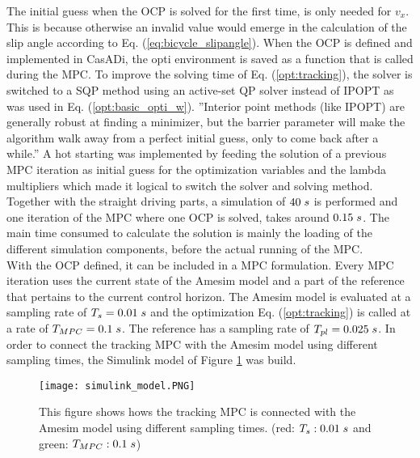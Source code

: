 The initial guess when the OCP is solved for the first time, is only needed for $v_x$. This is because otherwise an invalid value would emerge in the calculation of the slip angle according to Eq. (\ref{eq:bicycle_slipangle}). When the OCP is defined and implemented in CasADi, the opti environment is saved as a function that is called during the MPC. To improve the solving time of Eq. (\ref{opt:tracking}), the solver is switched to a SQP method using an active-set QP solver instead of IPOPT as was used in Eq. (\ref{opt:basic_opti_w}). ''Interior point methods (like IPOPT) are generally robust at finding a minimizer, but the barrier parameter will make the algorithm walk away from a perfect initial guess, only to come back after a while.'' \cite{Gillis2019} A hot starting was implemented by feeding the solution of a previous MPC iteration as initial guess for the optimization variables and the lambda multipliers which made it logical to switch the solver and solving method. Together with the straight driving parts, a simulation of $40\hspace{1mm}s$ is performed and one iteration of the MPC where one OCP is solved, takes around $0.15\hspace{1mm}s$. The main time consumed to calculate the solution is mainly the loading of the different simulation components, before the actual running of the MPC.\\

With the OCP defined, it can be included in a MPC formulation. Every MPC iteration uses the current state of the Amesim model and a part of the reference that pertains to the current control horizon. The Amesim model is evaluated at a sampling rate of $T_s = 0.01 \hspace{1mm}s$ and the optimization Eq. (\ref{opt:tracking}) is called at a rate of $T_{MPC} = 0.1 \hspace{1mm}s$. The reference has a sampling rate of $T_{pl} = 0.025\hspace{1mm}s$. In order to connect the tracking MPC with the Amesim model using different sampling times, the Simulink model of Figure \ref{fig:simulink_model} was build. \\

\begin{figure}[h!]
	\centering
	\texttt{[image: simulink\_model.PNG]}
	\caption{This figure shows hows the tracking MPC is connected with the Amesim model using different sampling times. (red: $T_s: 0.01\hspace{1mm}s$ and green: $T_{MPC}:0.1\hspace{1mm}s$)}	
	\label{fig:simulink_model}
\end{figure}

